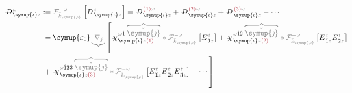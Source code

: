 \begin{subequations}
	\abovedisplayskip=6pt
	\belowdisplayskip=6pt
\begin{align}
	\Xint{\mathcolor{gray}{-}}{30}{D}^{\;\!\mathcolor{gray}{\omega}}_{\;\! \symup{\iota}\mathcolor{gray}{z}} &:= \mathcolor{gray}{\mathcal F_{\bar{k}_{\symup{\rho}}}^{-\omega}} \left[ D^{\;\! \mathcolor{gray}{t}}_{\;\! \symup{\iota}\mathcolor{gray}{z}} \right] = \Xint{\mathcolor{gray}{-}}{30}{D}^{\;\! \textcolor{Maroon}{(1)} \mathcolor{gray}{\omega}}_{\;\! \symup{\iota}\mathcolor{gray}{z}} + \Xint{\mathcolor{gray}{-}}{30}{D}^{\;\! \textcolor{Maroon}{(2)} \mathcolor{gray}{\omega}}_{\;\! \symup{\iota}\mathcolor{gray}{z}} + \Xint{\mathcolor{gray}{-}}{30}{D}^{\;\! \textcolor{Maroon}{(3)} \mathcolor{gray}{\omega}}_{\;\! \symup{\iota}\mathcolor{gray}{z}} + \cdots \\ &\hphantom{:}= {\symup{\varepsilon_0}} \mathcolor{gray}{\underbrace{\nabla_{\check{\jmath}}}} \left[ \Xint{{}^{}_{\mathcolor{gray}{-}}}{23}{\chi}^{\;\! \mathcolor{gray}{\omega} \hat{1} \;\! \mathcolor{gray}{\overbrace{\check{\symup{\jmath}}}}}_{\;\! \symup{\iota} \mathcolor{gray}{z} \textcolor{Maroon}{(1)}} \mathcolor{gray}{*} \mathcolor{gray}{\mathcal F_{\bar{k}_{\symup{\rho}}}^{-\omega}} \left[ E^{\;\!\mathcolor{gray}{t}}_{\;\! \hat{1} \mathcolor{gray}{z}} \right] + \Xint{{}^{}_{\mathcolor{gray}{-}}}{23}{\chi}^{\;\! \mathcolor{gray}{\omega} \hat{1} \hat{2} \;\! \mathcolor{gray}{\overbrace{\check{\symup{\jmath}}}}}_{\;\! \symup{\iota} \mathcolor{gray}{z} \textcolor{Maroon}{(2)}} \mathcolor{gray}{*} \mathcolor{gray}{\mathcal F_{\bar{k}_{\symup{\rho}}}^{-\omega}} \left[ E^{\;\!\mathcolor{gray}{t}}_{\;\! \hat{1} \mathcolor{gray}{z}} E^{\;\!\mathcolor{gray}{t}}_{\;\! \hat{2} \mathcolor{gray}{z}} \right] \right. \label{eq:D_wkrho} \\ &\hphantom{:}+ \left. \Xint{{}^{}_{\mathcolor{gray}{-}}}{23}{\chi}^{\;\! \mathcolor{gray}{\omega} \hat{1} \hat{2} \hat{3} \;\! \mathcolor{gray}{\overbrace{\check{\symup{\jmath}}}}}_{\;\! \symup{\iota} \mathcolor{gray}{z} \textcolor{Maroon}{(3)}} \mathcolor{gray}{*} \mathcolor{gray}{\mathcal F_{\bar{k}_{\symup{\rho}}}^{-\omega}} \left[ E^{\;\!\mathcolor{gray}{t}}_{\;\! \hat{1} \mathcolor{gray}{z}} E^{\;\!\mathcolor{gray}{t}}_{\;\! \hat{2} \mathcolor{gray}{z}} E^{\;\!\mathcolor{gray}{t}}_{\;\! \hat{3} \mathcolor{gray}{z}} \right] + \cdots \right]

\end{align}
\end{subequations}
